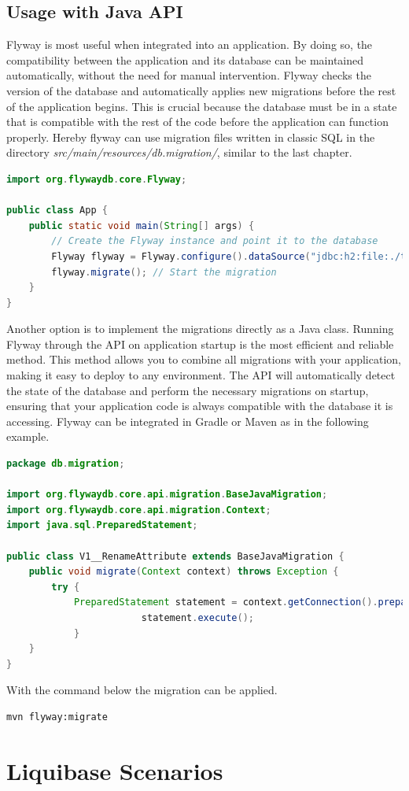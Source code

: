 \newpage
\subsection{Usage with Java API}
%
Flyway is most useful when integrated into an application. By doing so, the compatibility between the application and its database can be maintained automatically, without the need for manual intervention. Flyway checks the version of the database and automatically applies new migrations before the rest of the application begins. This is crucial because the database must be in a state that is compatible with the rest of the code before the application can function properly. Hereby flyway can use migration files written in classic SQL in the directory \textit{src/main/resources/db.migration/}, similar to the last chapter.

\begin{lstlisting}[language=Java]
import org.flywaydb.core.Flyway;

public class App {
	public static void main(String[] args) {
		// Create the Flyway instance and point it to the database
		Flyway flyway = Flyway.configure().dataSource("jdbc:h2:file:./target/foobar", "sa", null).load();
		flyway.migrate(); // Start the migration
	}
}
\end{lstlisting}

%
Another option is to implement the migrations directly as a Java class. Running Flyway through the API on application startup is the most efficient and reliable method. This method allows you to combine all migrations with your application, making it easy to deploy to any environment. The API will automatically detect the state of the database and perform the necessary migrations on startup, ensuring that your application code is always compatible with the database it is accessing.
Flyway can be integrated in Gradle or Maven as in the following example.

\begin{lstlisting}[language=Java, caption={File: src/main/java/db/migration/V3\_\_rename\_attribute.sql}]
package db.migration;

import org.flywaydb.core.api.migration.BaseJavaMigration;
import org.flywaydb.core.api.migration.Context;
import java.sql.PreparedStatement;

public class V1__RenameAttribute extends BaseJavaMigration {
	public void migrate(Context context) throws Exception {
		try {
			PreparedStatement statement = context.getConnection().prepareStatement("ALTER TABLE customer RENAME COLUMN email TO private_email;")) {
						statement.execute();
			}
	}
}
\end{lstlisting}

With the command below the migration can be applied.
 \begin{lstlisting}
mvn flyway:migrate
 \end{lstlisting}


\newpage
\section{Liquibase Scenarios}



\newpage